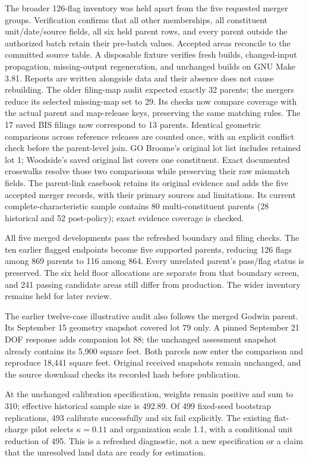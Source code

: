 The broader 126-flag inventory was held apart from the five requested merger
groups. Verification confirms that all other memberships, all constituent
unit/date/source fields, all six held parent rows, and every parent outside
the authorized batch retain their pre-batch values. Accepted areas reconcile
to the committed source table. A disposable fixture verifies fresh builds,
changed-input propagation, missing-output regeneration, and unchanged builds
on GNU Make 3.81. Reports are written alongside data and their absence does
not cause rebuilding. The older filing-map audit expected exactly 32 parents;
the mergers reduce its selected missing-map set to 29. Its checks now compare
coverage with the actual parent and map-release keys, preserving the same
matching rules. The 17 saved BIS filings now correspond to 13 parents.
Identical geometric comparisons across reference releases are counted once,
with an explicit conflict check before the parent-level join. GO Broome's
original lot list includes retained lot 1; Woodside's saved original list
covers one constituent. Exact documented crosswalks resolve those two
comparisons while preserving their raw mismatch fields.
The parent-link casebook retains its original evidence and adds the five
accepted merger records, with their primary sources and limitations. Its
current complete-characteristic sample contains 80 multi-constituent parents
(28 historical and 52 post-policy); exact evidence coverage is checked.

All five merged developments pass the refreshed boundary and filing checks.
The ten earlier flagged endpoints become five supported parents, reducing 126
flags among 869 parents to 116 among 864. Every unrelated parent's pass/flag
status is preserved. The six held floor allocations are separate from that
boundary screen, and 241 passing candidate areas still differ from production.
The wider inventory remains held for later review.

The earlier twelve-case illustrative audit also follows the merged Godwin
parent. Its September 15 geometry snapshot covered lot 79 only. A pinned
September 21 DOF response adds companion lot 88; the unchanged assessment
snapshot already contains its 5,900 square feet. Both parcels now enter the
comparison and reproduce 18,441 square feet. Original received snapshots remain
unchanged, and the source download checks its recorded hash before publication.

At the unchanged calibration specification, weights remain positive and sum
to 310; effective historical sample size is 492.89. Of 499 fixed-seed bootstrap
replications, 493 calibrate successfully and six fail explicitly. The existing
flat-charge pilot selects $\kappa=0.11$ and organization scale 1.1, with a
conditional unit reduction of 495. This is a refreshed diagnostic, not a new
specification or a claim that the unresolved land data are ready for estimation.

